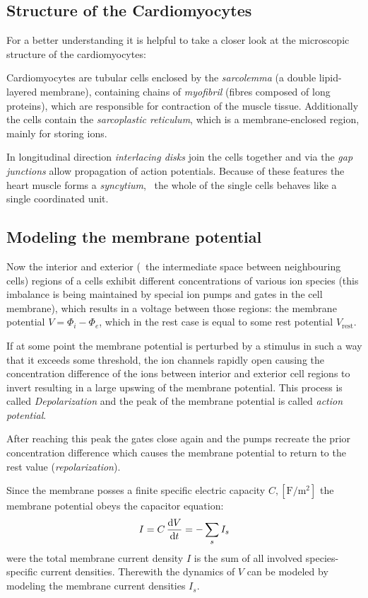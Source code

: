 \subsection{Structure of the Cardiomyocytes}
For a better understanding it is helpful to take a closer look at the
microscopic structure of the cardiomyocytes:

Cardiomyocytes are tubular cells enclosed by the \emph{sarcolemma} (a double
lipid-layered membrane), containing chains of \emph{myofibril} (fibres composed
of long proteins), which are responsible for contraction of the muscle tissue.
Additionally the cells contain the \emph{sarcoplastic reticulum}, which is a
membrane-enclosed region, mainly for storing  ions.

In longitudinal direction \emph{interlacing disks} join the cells together
and via the \emph{gap junctions} allow propagation of action potentials.
Because of these features the heart muscle forms a \emph{syncytium}, \ie~the
whole of the single cells behaves like a single coordinated unit.


\subsection{Modeling the membrane potential}
Now the interior and exterior (\ie~the intermediate space between
neighbouring cells) regions of a cells exhibit different concentrations of
various ion species (this imbalance is being maintained by special ion
pumps and gates in the cell membrane), which results in a voltage between
those regions: the membrane potential $V=\Phi_i-\Phi_e$, which in the rest
case is equal to some rest potential $V_{\mathrm{rest}}$.

If at some point the membrane potential is perturbed by a stimulus in such
a way that it exceeds some threshold, the ion channels rapidly open causing
the concentration difference of the ions between interior and exterior
cell regions to invert resulting in a large upswing of the membrane
potential. This process is called \emph{Depolarization} and the peak of the
membrane potential is called \emph{action potential}.

After reaching this peak the gates close again and the pumps recreate the
prior concentration difference which causes the membrane potential to
return to the rest value (\emph{repolarization}).

Since the membrane posses a finite specific electric capacity $C,
[\si{\farad\per\metre\squared}]$
the membrane potential obeys the capacitor equation:
\begin{equation}
    I=C\,\dv{V}{t}=-\sum_{s}I_{s}
    \label{eq:cap}
\end{equation}
were the total membrane current density $I$ is the sum of all involved
species-specific current densities.
Therewith the dynamics of $V$ can be modeled by modeling the
membrane current densities $I_s$.


